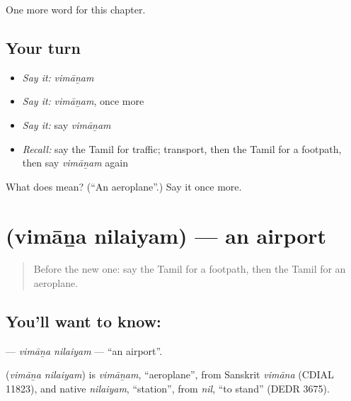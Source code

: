 \begin{grammarlens}[title={What you've built}]
One more word for this chapter.
\end{grammarlens}

\subsection*{Your turn}
\begin{itemize}
\raggedright
  \item \emph{Say it:} \emph{vimāṉam}
  \item \emph{Say it:} \emph{vimāṉam}, once more
  \item \emph{Say it:} say \emph{vimāṉam}
  \item \emph{Recall:} say the Tamil for traffic; transport, then the Tamil for a footpath, then say \emph{vimāṉam} again
\end{itemize}

\begin{tcolorbox}[breakable,colback=teal!4,colframe=teal!35!black,title={Before you move on}]
What does  mean? (\textquotedblleft{}An aeroplane\textquotedblright{}.) Say it once more.
\end{tcolorbox}
\section[\texorpdfstring{\ta{விமான} \ta{நிலையம்} (vimāṉa nilaiyam)}{விமான நிலையம் (vimāṉa nilaiyam)}]{  (vimāṉa nilaiyam) — an airport}

\label{lesson:TA-C263-vimana-nilaiyam}



\begin{quote}
Before the new one: say the Tamil for a footpath, then the Tamil for an aeroplane.
\end{quote}

\subsection*{You'll want to know:  }
\textbf{ } — \emph{vimāṉa nilaiyam} — \textquotedblleft{}an airport\textquotedblright{}.

\begin{cousinweb}
\textbf{ } (\emph{vimāṉa nilaiyam}) is \emph{vimāṉam}, \textquotedblleft{}aeroplane\textquotedblright{}, from Sanskrit \emph{vimāna} (CDIAL 11823), and native \emph{nilaiyam}, \textquotedblleft{}station\textquotedblright{}, from \emph{nil}, \textquotedblleft{}to stand\textquotedblright{} (DEDR 3675).
\end{cousinweb}

